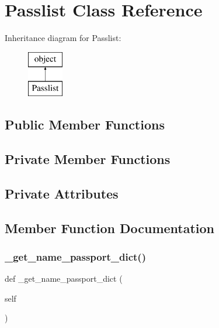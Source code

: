 \hypertarget{classopenbu_1_1passlist_1_1_passlist}{}\section{Passlist Class Reference}
\label{classopenbu_1_1passlist_1_1_passlist}
Inheritance diagram for Passlist\+:\begin{figure}[H]
\begin{center}
\leavevmode
\includegraphics[height=2.000000cm]{classopenbu_1_1passlist_1_1_passlist}
\end{center}
\end{figure}
\subsection*{Public Member Functions}
\subsection*{Private Member Functions}
\subsection*{Private Attributes}


\subsection{Member Function Documentation}
\mbox{\label{classopenbu_1_1passlist_1_1_passlist_a8c7ed2f12d3dbb3dd307013850e75afd}} 
\subsubsection{\texorpdfstring{\+\_\+get\+\_\+name\+\_\+passport\+\_\+dict()}{\_get\_name\_passport\_dict()}}
{\footnotesize\ttfamily def \+\_\+get\+\_\+name\+\_\+passport\+\_\+dict (\begin{DoxyParamCaption}\item[{}]{self }\end{DoxyParamCaption})\hspace{0.3cm}{\ttfamily [private]}}

